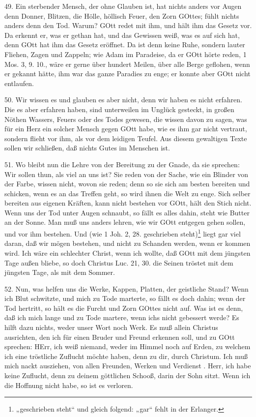 49. Ein sterbender Mensch, der ohne Glauben ist, hat nichts anders vor Augen denn Donner, Blitzen, die Hölle, höllisch Feuer, den Zorn GOttes; fühlt nichts anders denn den Tod. Warum? GOtt redet mit ihm, und hält ihm das Gesetz vor. Da erkennt er, was er gethan hat, und das Gewissen weiß, was es auf sich hat, denn GOtt hat ihm das Gesetz eröffnet. Da ist denn keine Ruhe, sondern lauter Fliehen, Zagen und Zappeln; wie Adam im Paradeise, da er GOtt hörte reden, 1 Mos. 3, 9. 10., wäre er gerne über hundert Meilen, über alle Berge geflohen, wenn er gekannt hätte, ihm war das ganze Paradies zu enge; er konnte aber GOtt nicht entlaufen.

50. Wir wissen es und glauben es aber nicht, denn wir haben es nicht erfahren. Die es aber erfahren haben, sind unterweilen im Unglück gesteckt, in großen Nöthen Wassers, Feuers oder des Todes gewesen, die wissen davon zu sagen, was für ein Herz ein solcher Mensch gegen GOtt habe, wie es ihm gar nicht vertraut, sondern flieht vor ihm, als vor dem leidigen Teufel. Aus diesem gewaltigen Texte sollen wir schließen, daß nichts Gutes im Menschen ist.

51. Wo bleibt nun die Lehre von der Bereitung zu der Gnade, da sie sprechen: Wir sollen thun, als viel an uns ist? Sie reden von der Sache, wie ein Blinder von der Farbe, wissen nicht, wovon sie reden; denn so sie sich am besten bereiten und schicken, wenn es an das Treffen geht, so wird ihnen die Welt zu enge. Sich selber bereiten aus eigenen Kräften, kann nicht bestehen vor GOtt, hält den Stich nicht. Wenn uns der Tod unter Augen schnaubt, so fällt es alles dahin, steht wie Butter an der Sonne. Man muß uns anders lehren, wie wir GOtt entgegen gehen sollen, und vor ihm bestehen. Und (wie 1 Joh. 2, 28. geschrieben steht)\footnote{„geschrieben steht“ und gleich folgend: „gar“ fehlt in der Erlanger.} liegt gar viel daran, daß wir mögen bestehen, und nicht zu Schanden werden, wenn er kommen wird. Ich wäre ein schlechter Christ, wenn ich wollte, daß GOtt mit dem jüngsten Tage außen bliebe, so doch Christus Luc. 21, 30. die Seinen tröstet mit dem jüngsten Tage, als mit dem Sommer.

52. Nun, was helfen uns die Werke, Kappen, Platten, der geistliche Stand? Wenn ich Blut schwitzte, und mich zu Tode marterte, so fällt es doch dahin; wenn der Tod hertritt, so hält es die Furcht und Zorn GOttes nicht auf. Was ist es denn, daß ich mich lange und zu Tode martere, wenn ichs nicht gebessert werde? Es hilft dazu nichts, weder unser Wort noch Werk. Es muß allein Christus ausrichten, den ich für einen Bruder und Freund erkennen soll, und zu GOtt sprechen: HErr, ich weiß niemand, weder im Himmel noch auf Erden, zu welchem ich eine tröstliche Zuflucht möchte haben, denn zu dir, durch Christum. Ich muß mich nackt ausziehen, von allen Freunden, Werken und Verdienst
. Herr, ich habe keine Zuflucht, denn zu deinem göttlichen Schooß, darin der Sohn sitzt. Wenn ich die Hoffnung nicht habe, so ist es verloren.

